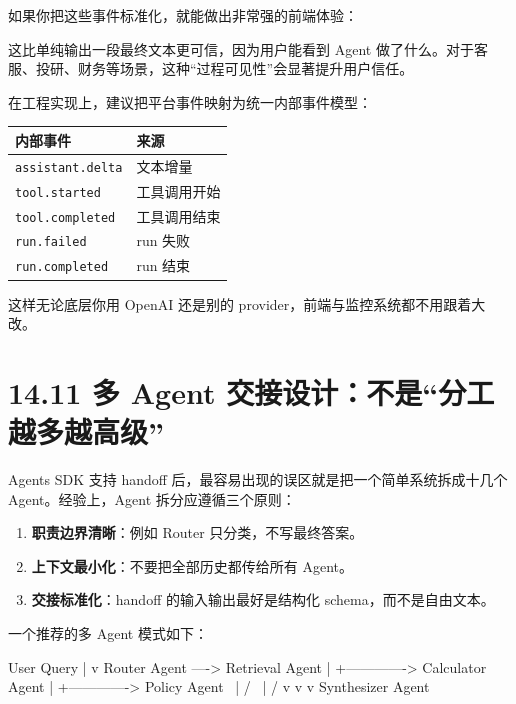 如果你把这些事件标准化，就能做出非常强的前端体验：


\begin{codeblock}
\end{codeblock}

这比单纯输出一段最终文本更可信，因为用户能看到 Agent 做了什么。对于客服、投研、财务等场景，这种``过程可见性''会显著提升用户信任。


在工程实现上，建议把平台事件映射为统一内部事件模型：


\begingroup
\scriptsize
\setlength{\tabcolsep}{3pt}
\begin{longtable}{|p{}|p{}|}
\hline
内部事件 & 来源 \\ \hline
\texttt{assistant.delta} & 文本增量 \\ \hline
\texttt{tool.started} & 工具调用开始 \\ \hline
\texttt{tool.completed} & 工具调用结束 \\ \hline
\texttt{run.failed} & run 失败 \\ \hline
\texttt{run.completed} & run 结束 \\ \hline
\end{longtable}
\endgroup

这样无论底层你用 OpenAI 还是别的 provider，前端与监控系统都不用跟着大改。


\section{14.11 多 Agent 交接设计：不是``分工越多越高级''}

Agents SDK 支持 handoff 后，最容易出现的误区就是把一个简单系统拆成十几个 Agent。经验上，Agent 拆分应遵循三个原则：


\begin{enumerate}[leftmargin=2em]
\item \textbf{职责边界清晰}：例如 Router 只分类，不写最终答案。
\item \textbf{上下文最小化}：不要把全部历史都传给所有 Agent。
\item \textbf{交接标准化}：handoff 的输入输出最好是结构化 schema，而不是自由文本。
\end{enumerate}

一个推荐的多 Agent 模式如下：


\begin{codeblock}
User Query
   |
   v
Router Agent ----> Retrieval Agent
   |
   +-------------> Calculator Agent
   |
   +-------------> Policy Agent
             \         |         /
              \        |        /
               v       v       v
                  Synthesizer Agent
\end{codeblock}

